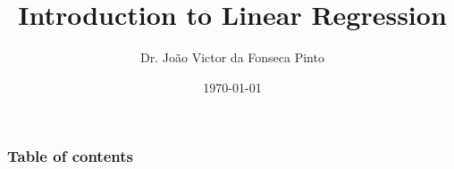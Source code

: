 \documentclass{beamer}
\begin{document}
\title{Introduction to Linear Regression}  
\author{Dr. João Victor da Fonseca Pinto}
\date{\today} 

\begin{frame}
\titlepage
\end{frame}

\begin{frame}
    \frametitle{Table of contents}
    \tableofcontents
\end{frame} 




\end{document}
